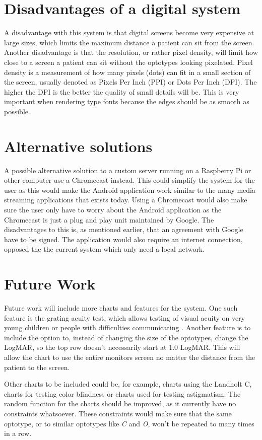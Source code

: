 \documentclass[12pt,a4paper,notitlepage]{report}
\begin{document}
\section{Disadvantages of a digital system}
A disadvantage with this system is that digital screens become very expensive at large sizes, which limits the maximum distance a patient can sit from the screen. Another disadvantage is that the resolution, or rather pixel density, will limit how close to a screen a patient can sit without the optotypes looking pixelated. Pixel density is a measurement of how many pixels (dots) can fit in a small section of the screen, usually denoted as Pixels Per Inch (PPI) or Dots Per Inch (DPI). The higher the DPI is the better the quality of small details will be. This is very important when rendering type fonts because the edges should be as smooth as possible.

\section{Alternative solutions}
A possible alternative solution to a custom server running on a Raspberry Pi or other computer use a Chromecast instead. This could simplify the system for the user as this would make the Android application work similar to the many media streaming applications that exists today. Using a Chromecast would also make sure the user only have to worry about the Android application as the Chromecast is just a plug and play unit maintained by Google. The disadvantages to this is, as mentioned earlier, that an agreement with Google have to be signed. The application would also require an internet connection, opposed the the current system which only need a local network.

\section{Future Work}
Future work will include more charts and features for the system. One such feature is the grating acuity test, which allows testing of visual acuity on very young children or people with difficulties communicating \cite{PGSoderbergOral}. Another feature is to include the option to, instead of changing the size of the optotypes, change the LogMAR, so the top row doesn't necessarily start at 1.0 LogMAR. This will allow the chart to use the entire monitors screen no matter the distance from the patient to the screen.

Other charts to be included could be, for example, charts using the Landholt C, charts for testing color blindness or charts used for testing astigmatism. The random function for the charts should be improved, as it currently have no constraints whatsoever. These constraints would make sure that the same optotype, or to similar optotypes like \textit{C} and \textit{O}, won't be repeated to many times in a row.
\end{document}
